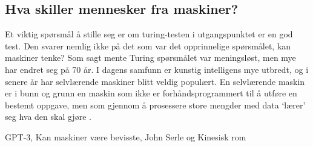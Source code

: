 \subsection{Hva skiller mennesker fra maskiner?}

Et viktig spørsmål å stille seg er om turing-testen i utgangspunktet er en god test. 
Den svarer nemlig ikke på det som var det opprinnelige spørsmålet, kan maskiner tenke? 
Som sagt mente Turing spørsmålet var meningsløst, men mye har endret seg på 70 år. 
I dagens samfunn er kunstig intelligens mye utbredt, og i senere år har selvlærende maskiner blitt veldig populært.
En selvlærende maskin er i bunn og grunn en maskin som ikke er forhåndsprogrammert til å utføre en bestemt oppgave, 
men som gjennom å prosessere store mengder med data `lærer' seg hva den skal gjøre \autocite[3]{Kiran2013}. 

GPT-3, Kan maskiner være bevisste,
John Serle og Kinesisk rom